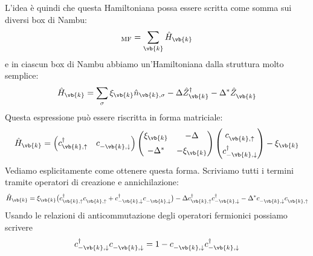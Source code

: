 L'idea è quindi che questa Hamiltoniana possa essere scritta come somma sui diversi box di Nambu:
\begin{equation*}
   [\hat{H} - \mu \hat{N}]_{\rm MF}
   = \sum_{\vb{k}} \hat{H}_{\vb{k}}
\end{equation*}
e in ciascun box di Nambu abbiamo un'Hamiltoniana dalla struttura molto semplice:
\begin{equation*}
   \hat{H}_{\vb{k}}
   =
   \sum_{\sigma}
   \xi_{\vb{k}}
   \hat{n}_{\vb{k},\sigma}
   -
   \Delta
   \hat{Z}^{\dag}_{\vb{k}}
   -
   \Delta^*
   \hat{Z}^{\vphantom{\dag}}_{\vb{k}}
\end{equation*}
Questa espressione può essere riscritta in forma matriciale:
\begin{equation*}
   \hat{H}_{\vb{k}}
   =
   \begin{pmatrix}
      c^{\dag}_{\vb{k},\uparrow}
      &
      c^{\vphantom{\dag}}_{-\vb{k},\downarrow}
   \end{pmatrix}
   \begin{pmatrix}
      \xi_{\vb{k}} & -\Delta\\[0.2cm]
      -\Delta^* & -\xi_{\vb{k}}
   \end{pmatrix}
   \begin{pmatrix}
      c^{\vphantom{\dag}}_{\vb{k},\uparrow}\\[0.2cm]
      c^{\dag}_{-\vb{k},\downarrow}
   \end{pmatrix}
   - \xi_{\vb{k}}
\end{equation*}
Vediamo esplicitamente come ottenere questa forma. Scriviamo tutti i termini tramite operatori di creazione e annichilazione:
\begin{equation*}
   \hat{H}_{\vb{k}}
   =
   \xi_{\vb{k}}
   \bigl(
      c^{\dag}_{\vb{k}, \uparrow}
      c^{\vphantom{\dag}}_{\vb{k}, \uparrow}
      +
      c^{\dag}_{-\vb{k}, \downarrow}
      c^{\vphantom{\dag}}_{-\vb{k}, \downarrow}
   \bigr)
   -
   \Delta
   c^{\dag}_{\vb{k}, \uparrow}
   c^{\dag}_{-\vb{k}, \downarrow}
   -
   \Delta^*
   c^{\vphantom{\dag}}_{-\vb{k}, \downarrow}
   c^{\vphantom{\dag}}_{\vb{k}, \uparrow}
\end{equation*}
Usando le relazioni di anticommutazione degli operatori fermionici possiamo scrivere
\begin{equation*}
   c^{\dag}_{-\vb{k}, \downarrow}
   c^{\vphantom{\dag}}_{-\vb{k}, \downarrow}
   =
   1
   -
   c^{\vphantom{\dag}}_{-\vb{k}, \downarrow}
   c^{\dag}_{-\vb{k}, \downarrow}
\end{equation*}

